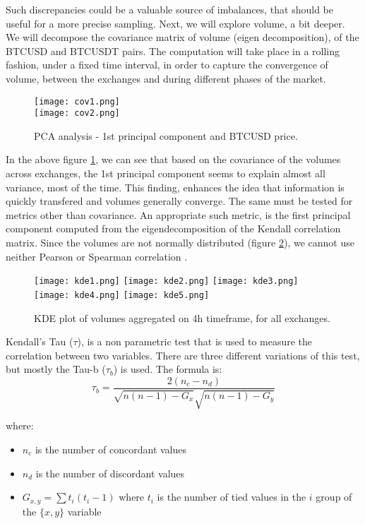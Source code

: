 Such discrepancies could be a valuable source of imbalances, that should be useful for a more precise sampling. Next, we will explore volume, a bit deeper. We will decompose the covariance matrix of volume (eigen decomposition), of the BTCUSD
and BTCUSDT pairs. The computation will take place in a rolling fashion, under a fixed time interval, in order to capture the convergence of volume, between the exchanges and during different phases of the market.


\begin{figure}[H]
	\centering
    \texttt{[image: cov1.png]} \\
    \texttt{[image: cov2.png]} \\
	\caption{PCA analysis - 1st principal component and BTCUSD price.}
    \label{fig:covmatrix}
\end{figure}

In the above figure \ref{fig:covmatrix}, we can see that based on the covariance of the volumes across exchanges, the 1st principal component seems to explain almost all variance, most of the time. This finding, enhances the idea that information is quickly transfered and volumes generally converge. The same must be tested for metrics other than covariance. An appropriate such metric, is the first principal component computed from the eigendecomposition of the Kendall correlation matrix. Since the volumes are not normally distributed (figure \ref{fig:kdevol}), we cannot use neither Pearson or Spearman correlation \cite{kendall}.


\begin{figure}[H]
	\centering
    \texttt{[image: kde1.png]}
    \texttt{[image: kde2.png]}
    \texttt{[image: kde3.png]}
    \texttt{[image: kde4.png]}
    \texttt{[image: kde5.png]}
	\caption{KDE plot of volumes aggregated on 4h timeframe, for all exchanges.}
    \label{fig:kdevol}
\end{figure}


Kendall's Tau (\(\tau\)), is a non parametric test that is used to measure the correlation between two variables. There are three different variations of this test, but mostly the Tau-b (\(\tau_b\)) is used. The formula is:
\[
\tau_b = \frac{2(n_c - n_d)}{\sqrt{n(n-1) - G_x}\sqrt{n(n-1) - G_y}} 
\]

where:
\begin{itemize}
\item \(n_c\) is the number of concordant values
\item \(n_d\) is the number of discordant values
\item \(G_{x,y} = \sum{t_i(t_i-1)}\) where \(t_i\) is the number of tied values in the \(i\) group of the \(\{x,y\}\) variable
\end{itemize}

